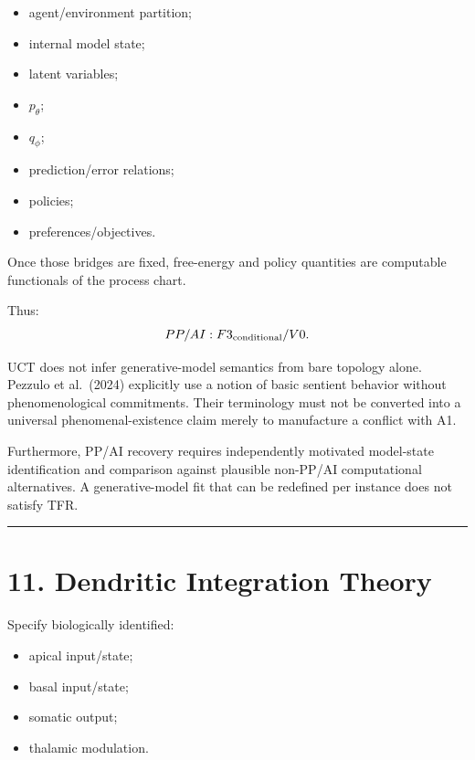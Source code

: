 \documentclass[
  11pt,
  a4paper,
]{article}
\providecommand{\tightlist}{%
  \setlength{\itemsep}{0pt}\setlength{\parskip}{0pt}}
\begin{document}
\begin{itemize}
\tightlist
\item
  agent/environment partition;
\item
  internal model state;
\item
  latent variables;
\item
  \(p_\theta\);
\item
  \(q_\phi\);
\item
  prediction/error relations;
\item
  policies;
\item
  preferences/objectives.
\end{itemize}

Once those bridges are fixed, free-energy and policy quantities are
computable functionals of the process chart.

Thus:
\nopagebreak[4]
\[
PP/AI:F3_{\rm conditional}/V0.
\]

UCT does not infer generative-model semantics from bare topology alone.
Pezzulo et al.~(2024) explicitly use a notion of basic sentient behavior
without phenomenological commitments. Their terminology must not be
converted into a universal phenomenal-existence claim merely to
manufacture a conflict with A1.

Furthermore, PP/AI recovery requires independently motivated model-state
identification and comparison against plausible non-PP/AI computational
alternatives. A generative-model fit that can be redefined per instance
does not satisfy TFR.

\begin{center}\rule{0.5\linewidth}{0.5pt}\end{center}

\hypertarget{dendritic-integration-theory}{%
\section{11. Dendritic Integration
Theory}\label{dendritic-integration-theory}}

Specify biologically identified:

\begin{itemize}
\tightlist
\item
  apical input/state;
\item
  basal input/state;
\item
  somatic output;
\item
  thalamic modulation.
\end{itemize}
\end{document}

